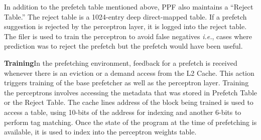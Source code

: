%
%
%


In addition to the prefetch table mentioned above, PPF also maintains
a ``Reject Table.''  The reject table is a 1024-entry deep
direct-mapped table.  If a prefetch suggestion is rejected by the
perceptron layer, it is logged into the reject table.  The filer is
used to train the perceptron to %
avoid false negatives \textit{i.e.}, cases where prediction was to
reject the prefetch but the prefetch would have been useful.



\textbf{Training}\newline In the prefetching environment, feedback for
a prefetch is received whenever there is an eviction or a demand
access from the L2 Cache.  This action triggers training of the base
prefetcher as well as the perceptron layer.  Training the perceptrons
involves accessing the metadata that was stored in Prefetch Table or
the Reject Table.  The cache lines address of the block being trained
is used to access a table, using 10-bits of the address for indexing
and another 6-bits to perform tag matching.  Once the state of the
program at the time of prefetching is available, it is
used to index into the perceptron weights table.

